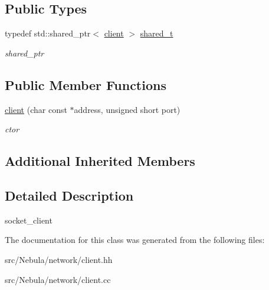 \subsection*{Public Types}
\begin{DoxyCompactItemize}
\item 
\hypertarget{classgal_1_1network_1_1client_a87ba8d69e62ce4ee5895913bf597ad6f}{typedef std\-::shared\-\_\-ptr$<$ \hyperlink{classgal_1_1network_1_1client}{client} $>$ \hyperlink{classgal_1_1network_1_1client_a87ba8d69e62ce4ee5895913bf597ad6f}{shared\-\_\-t}}\label{classgal_1_1network_1_1client_a87ba8d69e62ce4ee5895913bf597ad6f}

\begin{DoxyCompactList}\small\item\em shared\-\_\-ptr \end{DoxyCompactList}\end{DoxyCompactItemize}
\subsection*{Public Member Functions}
\begin{DoxyCompactItemize}
\item 
\hypertarget{classgal_1_1network_1_1client_a96e27f11ea9281a51109d3fe6e419bee}{\hyperlink{classgal_1_1network_1_1client_a96e27f11ea9281a51109d3fe6e419bee}{client} (char const $\ast$address, unsigned short port)}\label{classgal_1_1network_1_1client_a96e27f11ea9281a51109d3fe6e419bee}

\begin{DoxyCompactList}\small\item\em ctor \end{DoxyCompactList}\end{DoxyCompactItemize}
\subsection*{Additional Inherited Members}


\subsection{Detailed Description}
socket\-\_\-client 

The documentation for this class was generated from the following files\-:\begin{DoxyCompactItemize}
\item 
src/\-Nebula/network/client.\-hh\item 
src/\-Nebula/network/client.\-cc\end{DoxyCompactItemize}
